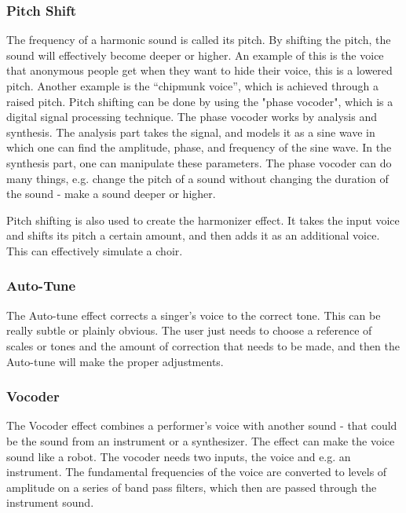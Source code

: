 \subsubsection{Pitch Shift}

The frequency of a harmonic sound is called its pitch\citep{Katjaas_00}. By shifting the pitch, the sound will effectively become deeper or higher. An example of this is the voice that anonymous people get when they want to hide their voice, this is a lowered pitch. Another example is the “chipmunk voice”, which is achieved through a raised pitch.
Pitch shifting can be done by using the "phase vocoder", which is a digital signal processing technique\citep{dolson}. The phase vocoder works by analysis and synthesis. The analysis part takes the signal, and models it as a sine wave in which one can find the amplitude, phase, and frequency of the sine wave. In the synthesis part, one can manipulate these parameters. 
The phase vocoder can do many things, e.g. change the pitch of a sound without changing the duration of the sound - make a sound deeper or higher. 

Pitch shifting is also used to create the harmonizer effect. It takes the input voice and shifts its pitch a certain amount, and then adds it as an additional voice. This can effectively simulate a choir.

\subsubsection{Auto-Tune}

The Auto-tune effect corrects a singer's voice to the correct tone\citep{Hadhazy_2010}. This can be really subtle or plainly obvious. 
The user just needs to choose a reference of scales or tones and the amount of correction that needs to be made, and then the Auto-tune will make the proper adjustments.

\subsubsection{Vocoder}

The Vocoder effect combines a performer's voice with another sound - that could be the sound from an instrument or a synthesizer\citep{Vocoder_00}. 
The effect can make the voice sound like a robot. The vocoder needs two inputs, the voice and e.g. an instrument. The fundamental frequencies of the voice are converted to levels of amplitude on a series of band pass filters, which then are passed through the instrument sound.


